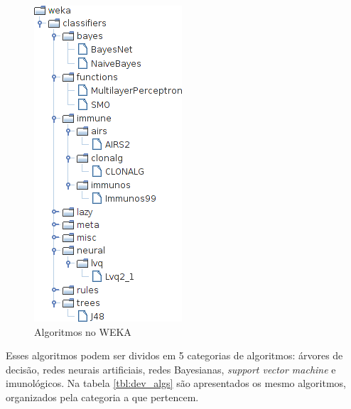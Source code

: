 \vspace{0.5cm}
\begin{figure}[h]
    \centering
    \caption{Algoritmos no WEKA}
    \label{fig:dev_weka_algos}
    \vspace{0.5cm}
    \includegraphics[height=0.5\textheight]{img/weka_algos_cropped.png}
    \vspace{0.5cm}
\end{figure}
\vspace{0.5cm}

Esses algoritmos podem ser dividos em 5 categorias de algoritmos: árvores de decisão, redes neurais artificiais, redes Bayesianas, \emph{support vector machine} e imunológicos. Na tabela \ref{tbl:dev_algs} são apresentados os mesmo algoritmos, organizados pela categoria a que pertencem.

